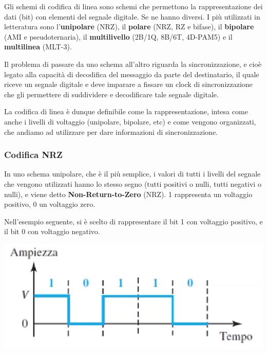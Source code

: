             Gli schemi di codifica di linea sono schemi che permettono la rappresentazione dei dati (bit) con elementi del segnale digitale. Se ne hanno diversi. I più utilizzati in letteratura sono l'\textbf{unipolare} (NRZ), il \textbf{polare} (NRZ, RZ e bifase), il \textbf{bipolare} (AMI e pseudoternaria), il \textbf{multilivello} (2B/1Q, 8B/6T, 4D-PAM5) e il \textbf{multilinea} (MLT-3). 
            
            Il problema di passare da uno schema all'altro riguarda la sincronizzazione, e cioè legato alla capacità di decodifica del messaggio da parte del destinatario, il quale riceve un segnale digitale e deve imparare a fissare un clock di sincronizzazione che gli permettere di suddividere e decodificare tale segnale digitale.
            
            \vspace{3mm}
            
            La codifica di linea è dunque definibile come la rappresentazione, intesa come anche i livelli di voltaggio (unipolare, bipolare, etc) e come vengono organizzati, che andiamo ad utilizzare per dare informazioni di sincronizzazione.
        
        \subsubsection{Codifica NRZ}
        
            In uno schema unipolare, che è il più semplice, i valori di tutti i livelli del segnale che vengono utilizzati hanno lo stesso segno (tutti positivi o nulli, tutti negativi o nulli), e viene detto \textbf{Non-Return-to-Zero} (NRZ). 1 rappresenta un voltaggio positivo, 0 un voltaggio zero.
            
            Nell'esempio seguente, si è scelto di rappresentare il bit 1 con voltaggio positivo, e il bit 0 con voltaggio negativo.
            
            \begin{center}
                \includegraphics[scale=0.5]{images/NRZ.png}
            \end{center}
            
